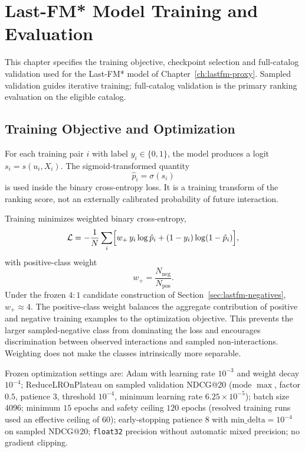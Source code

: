 \chapter{Last-FM* Model Training and Evaluation}
\label{ch:lastfm-ewaluacja}

This chapter specifies the training objective, checkpoint selection and full-catalog validation used for the Last-FM* model of Chapter~\ref{ch:lastfm-proxy}.
Sampled validation guides iterative training; full-catalog validation is the primary ranking evaluation on the eligible catalog.

\section{Training Objective and Optimization}
\label{sec:lastfm-train}

For each training pair $i$ with label $y_i\in\{0,1\}$, the model produces a logit $s_i=s(u_i,X_i)$.
The sigmoid-transformed quantity
\begin{equation}
\label{eq:lastfm-phat}
\hat{p}_i=\sigma(s_i)
\end{equation}
is used inside the binary cross-entropy loss.
It is a training transform of the ranking score, not an externally calibrated probability of future interaction.

Training minimizes weighted binary cross-entropy,
\begin{equation}
\label{eq:lastfm-bce}
\mathcal{L}
=
-\frac{1}{N}\sum_i
\Bigl[
w_{+}\,y_i\log\hat{p}_i
+(1-y_i)\log(1-\hat{p}_i)
\Bigr],
\end{equation}
with positive-class weight
\begin{equation}
w_{+}=\frac{N_{\mathrm{neg}}}{N_{\mathrm{pos}}}.
\end{equation}
Under the frozen $4{:}1$ candidate construction of Section~\ref{sec:lastfm-negatives}, $w_{+}\approx 4$.
The positive-class weight balances the aggregate contribution of positive and negative training examples to the optimization objective.
This prevents the larger sampled-negative class from dominating the loss and encourages discrimination between observed interactions and sampled non-interactions.
Weighting does not make the classes intrinsically more separable.

Frozen optimization settings are:
Adam with learning rate $10^{-3}$ and weight decay $10^{-4}$;
ReduceLROnPlateau on sampled validation NDCG@20 (mode $\max$, factor $0.5$, patience $3$, threshold $10^{-4}$, minimum learning rate $6.25\times 10^{-5}$);
batch size $4096$;
minimum $15$ epochs and safety ceiling $120$ epochs (resolved training runs used an effective ceiling of $60$);
early-stopping patience $8$ with $\mathrm{min\_delta}=10^{-4}$ on sampled NDCG@20;
\texttt{float32} precision without automatic mixed precision;
no gradient clipping.

